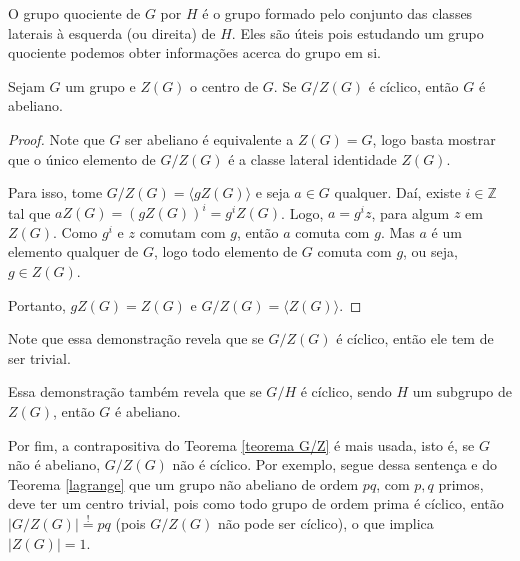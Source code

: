 	\begin{remark}
		O grupo quociente de $G$ por $H$ é o grupo formado pelo conjunto das classes laterais à esquerda (ou direita) de $H$. Eles são úteis pois estudando um grupo quociente podemos obter informações acerca do grupo em si.
	\end{remark}
	
	\begin{theorem}
		\label{teorema G/Z}
		Sejam $G$ um grupo e $Z(G)$ o centro de $G$. Se $G/Z(G)$ é cíclico, então $G$ é abeliano.
	\end{theorem}
	
	\begin{proof}
		Note que $G$ ser abeliano é equivalente a $Z(G) = G$, logo basta mostrar que o único elemento de $G/Z(G)$ é a classe lateral identidade $Z(G)$.
		\par\vspace{0.3cm} Para isso, tome $G/Z(G) = \langle gZ(G) \rangle$ e seja $a\in G$ qualquer. Daí, existe $i\in\mathbb{Z}$ tal que $aZ(G) = (gZ(G))^i = g^iZ(G)$. Logo, $a = g^iz$, para algum $z$ em $Z(G)$. Como $g^i$ e $z$ comutam com $g$, então $a$ comuta com $g$. Mas $a$ é um elemento qualquer de $G$, logo todo elemento de $G$ comuta com $g$, ou seja, $g\in Z(G)$.
		\par\vspace{0.3cm} Portanto, $gZ(G) = Z(G)$ e $G/Z(G) = \langle Z(G) \rangle$.
	\end{proof}
	
	\begin{remark}
		Note que essa demonstração revela que se $G/Z(G)$ é cíclico, então ele tem de ser trivial.
	\end{remark}
	
	\begin{remark}
		Essa demonstração também revela que se $G/H$ é cíclico, sendo $H$ um subgrupo de $Z(G)$, então $G$ é abeliano.
	\end{remark}
	
	\begin{remark}
		Por fim, a contrapositiva do Teorema \eqref{teorema G/Z} é mais usada, isto é, se $G$ não é abeliano, $G/Z(G)$ não é cíclico. Por exemplo, segue dessa sentença e do Teorema \eqref{lagrange} que um grupo não abeliano de ordem $pq$, com $p, q$ primos, deve ter um centro trivial, pois como todo grupo de ordem prima é cíclico, então $|G/Z(G)| \overset{!}{=} pq$ (pois $G/Z(G)$ não pode ser cíclico), o que implica $|Z(G)| = 1$. 
	\end{remark}
	
